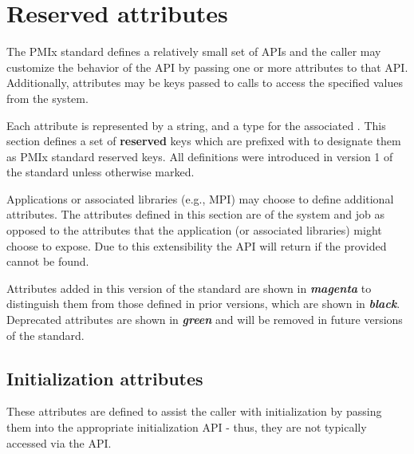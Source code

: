 \section{Reserved attributes}
\label{api:struct:attributes}

The PMIx standard defines a relatively small set of APIs and the caller may customize the behavior of the API by passing one or more attributes to that API.
Additionally, attributes may be keys passed to  calls to access the specified values from the system.

Each attribute is represented by a  string, and a type for the associated .
This section defines a set of \textbf{reserved} keys which are prefixed with  to designate them as PMIx standard reserved keys. All definitions were introduced in version 1 of the standard unless otherwise marked.

Applications or associated libraries (e.g., \ac{MPI}) may choose to define additional attributes.
The attributes defined in this section are of the system and job as opposed to the attributes that the application (or associated libraries) might choose to expose.
Due to this extensibility the  API will return  if the provided  cannot be found.

Attributes added in this version of the standard are shown in \textit{\textbf{\color{magenta}magenta}} to distinguish them from those defined in prior versions, which are shown in \textit{\textbf{black}}. Deprecated attributes are shown in \textit{\textbf{\color{green!80!black}green}} and will be removed in future versions of the standard.


\subsection{Initialization attributes}
\label{api:struct:attributes:init}

These attributes are defined to assist the caller with initialization by passing them into the appropriate initialization \ac{API} - thus, they are not typically accessed via the  \ac{API}.

%


